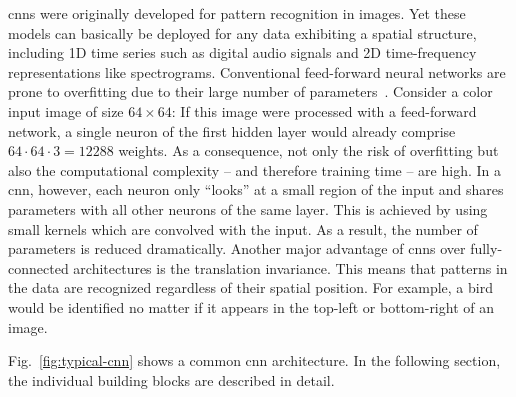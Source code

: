 \Glspl{cnn} were originally developed for pattern recognition in images. Yet these models can basically be deployed for any data exhibiting a spatial structure, including 1D time series such as digital audio signals and 2D time-frequency representations like spectrograms. Conventional feed-forward neural networks are prone to overfitting due to their large number of parameters~\cite{oshea2015introToCNN}. Consider a color input image of size $64\times64$: If this image were processed with a feed-forward network, a single neuron of the first hidden layer would already comprise $64 \cdot 64 \cdot 3 = 12288$ weights. As a consequence, not only the risk of overfitting but also the computational complexity -- and therefore training time -- are high. In a \gls{cnn}, however, each neuron only \enquote{looks} at a small region of the input and shares parameters with all other neurons of the same layer. This is achieved by using small kernels which are convolved with the input. As a result, the number of parameters is reduced dramatically. Another major advantage of \glspl{cnn} over fully-connected architectures is the translation invariance. This means that patterns in the data are recognized regardless of their spatial position. For example, a bird would be identified no matter if it appears in the top-left or bottom-right of an image.

Fig.~\ref{fig:typical-cnn} shows a common \gls{cnn} architecture. In the following section, the individual building blocks are described in detail.\\

